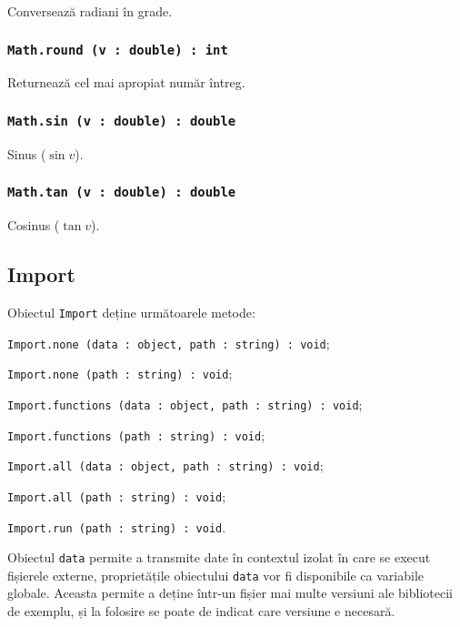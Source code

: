 Conversează radiani în grade.

\subsubsection{\texttt{Math.round (v : double) : int}}

Returnează cel mai apropiat număr întreg.

\subsubsection{\texttt{Math.sin (v : double) : double}}

Sinus ($\sin{v}$).

\subsubsection{\texttt{Math.tan (v : double) : double}}

Cosinus ($\tan{v}$).

\subsection{Import}

Obiectul \texttt{Import} deține următoarele metode:
\begin{icItems}
	\item \texttt{Import.none (data : object, path : string) : void};
	\item \texttt{Import.none (path : string) : void};
	\item \texttt{Import.functions (data : object, path : string) : void};
	\item \texttt{Import.functions (path : string) : void};
	\item \texttt{Import.all (data : object, path : string) : void};
	\item \texttt{Import.all (path : string) : void};
	\item \texttt{Import.run (path : string) : void}.
\end{icItems}

Obiectul \texttt{data} permite a transmite date în contextul izolat în care se execut fișierele externe, proprietățile obiectului \texttt{data} vor fi disponibile ca variabile globale. Aceasta permite a deține într-un fișier mai multe versiuni ale bibliotecii de exemplu, și la folosire se poate de indicat care versiune e necesară.

